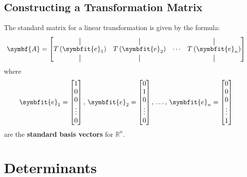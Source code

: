 \documentclass{article}
\begin{document}
\subsection{Constructing a Transformation Matrix}
\begin{theorem}
    The standard matrix for a linear transformation is given by the
    formula:
    \begin{equation*}
        \symbf{A} =
        \begin{bmatrix}
            \vertbar                    & \vertbar                    &        & \vertbar                    \\
            T\left(\symbfit{e}_1\right) & T\left(\symbfit{e}_2\right) & \cdots & T\left(\symbfit{e}_n\right) \\
            \vertbar                    & \vertbar                    &        & \vertbar
        \end{bmatrix}
    \end{equation*}
    where
    \begin{equation*}
        \symbfit{e}_1 =
        \begin{bmatrix}
            1      \\
            0      \\
            0      \\
            \vdots \\
            0
        \end{bmatrix}
        ,\, \symbfit{e}_2 =
        \begin{bmatrix}
            0      \\
            1      \\
            0      \\
            \vdots \\
            0
        \end{bmatrix}
        ,\, \dots,\, \symbfit{e}_n =
        \begin{bmatrix}
            0      \\
            0      \\
            0      \\
            \vdots \\
            1
        \end{bmatrix}
    \end{equation*}
    are the \textbf{standard basis vectors} for \(\mathbb{R}^n\).
\end{theorem}
\newpage
\section{Determinants}
\end{document}
